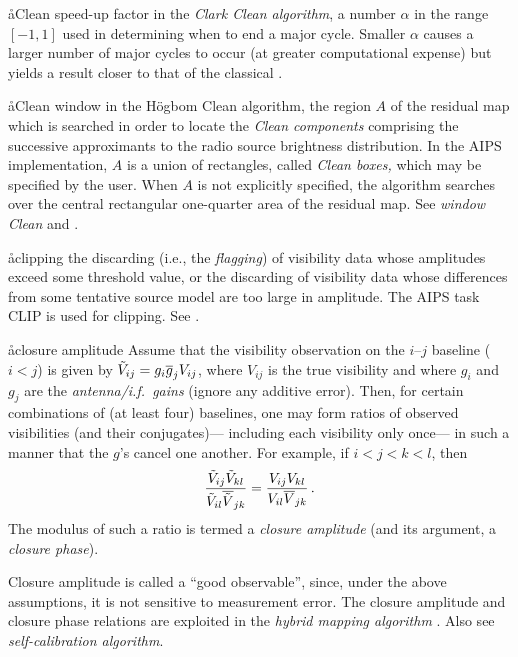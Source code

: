 \aa{Clean speed-up factor}
in the {\it Clark Clean algorithm}, a number $\alpha$ in the
range $[-1,1]$ used in determining when to end a major cycle.
Smaller $\alpha$ causes a larger number of major cycles to occur
(at greater computational expense)
but yields a result closer to that of the classical \hca.

\aa{Clean window}
in the H\"ogbom Clean algorithm, the region $A$ of the residual map
which is searched in order to locate the {\it Clean components}
comprising the successive approximants to the radio
source brightness distribution.
In the AIPS implementation, $A$ is a union of
rectangles, called {\it Clean boxes,} which may be specified
by the user.
When $A$ is not explicitly specified, the algorithm
searches over the central rectangular one-quarter area of the residual map.
See {\it window Clean} and \hca.

\aa{clipping}
the discarding (i.e., the {\it flagging}\/) of visibility data whose
amplitudes exceed some threshold value, or the discarding of visibility
data whose differences from some tentative source model are too large
in amplitude.
The AIPS task CLIP is used for clipping.
See .

\aa{closure amplitude}
Assume that the visibility observation on the $i$--$j$ baseline
($i<j$) is given by
$\tilde V_{ij}=g_i\overline g_jV_{ij}$, where $V_{ij}$ is the true
visibility and where $g_i$ and $g_j$ are the {\it antenna/i.f.\ gains}
(ignore any additive error).
Then, for certain combinations of (at least four) baselines,
one may form ratios of observed visibilities (and their conjugates)---%
including each visibility only once---%
in such a manner that the $g$'s cancel one another.
For example, if $i<j<k<l$, then
$${\tilde V_{ij}\tilde V_{kl}\over\tilde V_{il}{\overline{\tilde V}}_{jk}} =
{V_{ij}V_{kl}\over V_{il}\overline{V}_{jk}}\,.$$
The modulus of such a ratio is termed a {\it closure amplitude}
(and its argument, a {\it closure phase}).
\par
Closure amplitude is called a ``good observable'',
since, under the above assumptions, it is not sensitive to
measurement error.
The closure amplitude and closure phase relations are
exploited in the {\it hybrid mapping algorithm} \qv.
Also see {\it self-calibration algorithm}.

